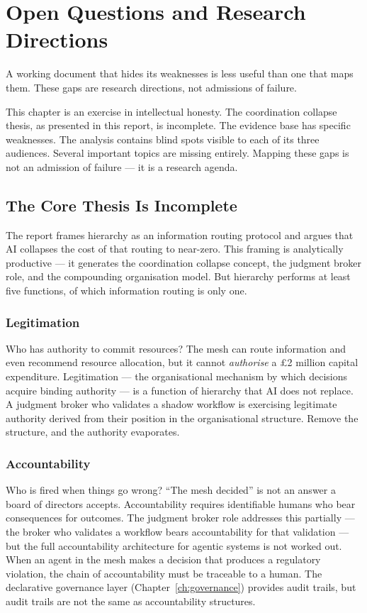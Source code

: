 \chapter{Open Questions and Research Directions}
\label{ch:open-questions}

\epigraph{A working document that hides its weaknesses is less useful than one that maps them. These gaps are research directions, not admissions of failure.}{}

This chapter is an exercise in intellectual honesty. The coordination collapse thesis, as presented in this report, is incomplete. The evidence base has specific weaknesses. The analysis contains blind spots visible to each of its three audiences. Several important topics are missing entirely. Mapping these gaps is not an admission of failure --- it is a research agenda.

\section{The Core Thesis Is Incomplete}

The report frames hierarchy as an information routing protocol and argues that AI collapses the cost of that routing to near-zero. This framing is analytically productive --- it generates the coordination collapse concept, the judgment broker role, and the compounding organisation model. But hierarchy performs at least five functions, of which information routing is only one.

\subsection{Legitimation}

Who has authority to commit resources? The mesh can route information and even recommend resource allocation, but it cannot \emph{authorise} a \pounds 2 million capital expenditure. Legitimation --- the organisational mechanism by which decisions acquire binding authority --- is a function of hierarchy that AI does not replace. A judgment broker who validates a shadow workflow is exercising legitimate authority derived from their position in the organisational structure. Remove the structure, and the authority evaporates.

\subsection{Accountability}

Who is fired when things go wrong? ``The mesh decided'' is not an answer a board of directors accepts. Accountability requires identifiable humans who bear consequences for outcomes. The judgment broker role addresses this partially --- the broker who validates a workflow bears accountability for that validation --- but the full accountability architecture for agentic systems is not worked out. When an agent in the mesh makes a decision that produces a regulatory violation, the chain of accountability must be traceable to a human. The declarative governance layer (Chapter~\ref{ch:governance}) provides audit trails, but audit trails are not the same as accountability structures.

